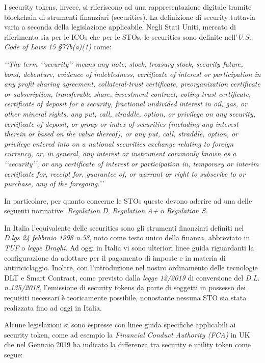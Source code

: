 I security tokens, invece, si riferiscono ad una rappresentazione digitale tramite blockchain di strumenti finanziari (securities). La definizione di security tuttavia varia a seconda della legislazione applicabile.
Negli Stati Uniti, mercato di riferimento sia per le ICOs che per le STOs, le securities sono definite nell'\textit{U.S. Code of Laws 15 §77b(a)(1)} come:

\textit{‘‘The term ‘‘security’’ means any note, stock, treasury stock, security future, bond, debenture, evidence of indebtedness, certificate of interest or participation in any profit sharing agreement, collateral-trust certificate, preorganization certificate or subscription, transferable share, investment contract, voting-trust certificate, certificate of deposit for a security, fractional undivided interest in oil, gas, or other mineral rights, any put, call, straddle, option, or privilege on any security, certificate of deposit, or group or index of securities (including any interest therein or based on the value thereof), or any put, call, straddle, option, or privilege entered into on a national securities exchange relating to foreign currency, or, in general, any interest or instrument commonly known as a ‘‘security’’, or any certificate of interest or participation in, temporary or interim certificate for, receipt for, guarantee of, or warrant or right to subscribe to or purchase, any of the foregoing.’’}

In particolare, per quanto concerne le STOs queste devono aderire ad una delle seguenti normative: \textit{Regulation D}, \textit{Regulation A+} o \textit{Regulation S}\cite{K31,K32,K33}. 

In Italia l'equivalente delle securities sono gli strumenti finanziari definiti nel \textit{D.lgs 24 febbraio 1998 n.58}, noto come testo unico della finanza, abbreviato in \textit{TUF} o \textit{legge Draghi}\cite{K34}. Ad oggi in Italia vi sono ulteriori linee guida riguardanti la configurazione da adottare per il pagamento di imposte e in materia di antiriciclaggio. Inoltre, con l'introduzione nel nostro ordinamento delle tecnologie DLT e Smart Contract, come previsto dalla \textit{legge 12/2019} di conversione del \textit{D.L. n.135/2018}, l'emissione di security tokens da parte di soggetti in possesso dei requisiti necessari è teoricamente possibile, nonostante nessuna STO sia stata realizzata fino ad oggi in Italia.

Alcune legislazioni si sono espresse con linee guida specifiche applicabili ai security token, come ad esempio la \textit{Financial Conduct Authority (FCA)} in UK che nel Gennaio 2019 ha indicato la differenza tra security e utility token come segue:


